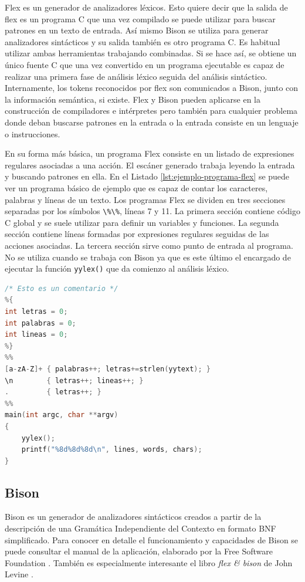 Flex es un generador de analizadores léxicos. Esto quiere decir que la salida de flex es un programa C que una vez compilado se puede utilizar para buscar patrones en un texto de entrada. Así mismo Bison se utiliza para generar analizadores sintácticos y su salida también es otro programa C. Es habitual utilizar ambas herramientas trabajando combinadas. Si se hace así, se obtiene un único fuente C que una vez convertido en un programa ejecutable es capaz de realizar una primera fase de análisis léxico seguida del análisis sintáctico. Internamente, los tokens reconocidos por flex son comunicados a Bison, junto con la información semántica, si existe. Flex y Bison pueden aplicarse en la construcción de compiladores e intérpretes pero también para cualquier problema donde deban buscarse patrones en la entrada o la entrada consiste en un lenguaje o instrucciones.

En su forma más básica, un programa Flex consiste en un listado de expresiones regulares asociadas a una acción. El escáner generado trabaja leyendo la entrada y buscando patrones en ella. En el Listado \ref{lst:ejemplo-programa-flex} se puede ver un programa básico de ejemplo que es capaz de contar los caracteres, palabras y líneas de un texto. Los programas Flex se dividen en tres secciones separadas por los símbolos \verb|\%\%|, líneas 7 y 11. La primera sección contiene código C global y se suele utilizar para definir un variables y funciones. La segunda sección contiene líneas formadas por expresiones regulares seguidas de las acciones asociadas. La tercera sección sirve como punto de entrada al programa. No se utiliza cuando se trabaja con Bison ya que es este último el encargado de ejecutar la función \verb|yylex()| que da comienzo al análisis léxico.

\begin{lstlisting}[language=C,caption={Ejemplo de programa Flex autónomo.},label=lst:ejemplo-programa-flex]
/* Esto es un comentario */
%{
int letras = 0;
int palabras = 0;
int lineas = 0;
%}
%%
[a-zA-Z]+ { palabras++; letras+=strlen(yytext); }
\n        { letras++; lineas++; }
.         { letras++; }
%%
main(int argc, char **argv)
{
    yylex();
    printf("%8d%8d%8d\n", lines, words, chars);
}
\end{lstlisting}

\subsection{Bison}

Bison es un generador de analizadores sintácticos creados a partir de la descripción de una Gramática Independiente del Contexto en formato BNF simplificado. Para conocer en detalle el funcionamiento y capacidades de Bison se puede consultar el manual de la aplicación, elaborado por la Free Software Foundation
\cite{fsf_web_bisonManual}. También es especialmente interesante el libro \emph{flex \& bison} de John Levine \cite{levine_book_flexBison}.

